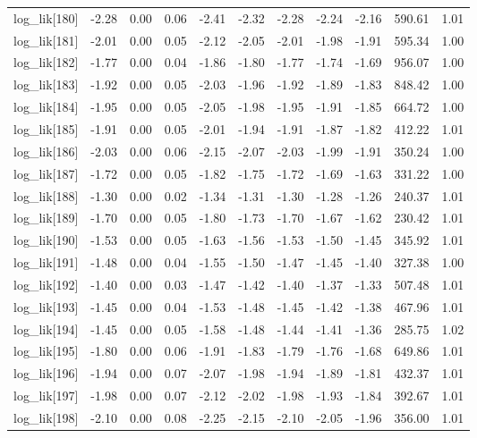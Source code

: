 \begin{table}[ht]
\begin{tabular}{rrrrrrrrrrr}
  log\_lik[180] & -2.28 & 0.00 & 0.06 & -2.41 & -2.32 & -2.28 & -2.24 & -2.16 & 590.61 & 1.01 \\ 
  log\_lik[181] & -2.01 & 0.00 & 0.05 & -2.12 & -2.05 & -2.01 & -1.98 & -1.91 & 595.34 & 1.00 \\ 
  log\_lik[182] & -1.77 & 0.00 & 0.04 & -1.86 & -1.80 & -1.77 & -1.74 & -1.69 & 956.07 & 1.00 \\ 
  log\_lik[183] & -1.92 & 0.00 & 0.05 & -2.03 & -1.96 & -1.92 & -1.89 & -1.83 & 848.42 & 1.00 \\ 
  log\_lik[184] & -1.95 & 0.00 & 0.05 & -2.05 & -1.98 & -1.95 & -1.91 & -1.85 & 664.72 & 1.00 \\ 
  log\_lik[185] & -1.91 & 0.00 & 0.05 & -2.01 & -1.94 & -1.91 & -1.87 & -1.82 & 412.22 & 1.01 \\ 
  log\_lik[186] & -2.03 & 0.00 & 0.06 & -2.15 & -2.07 & -2.03 & -1.99 & -1.91 & 350.24 & 1.00 \\ 
  log\_lik[187] & -1.72 & 0.00 & 0.05 & -1.82 & -1.75 & -1.72 & -1.69 & -1.63 & 331.22 & 1.00 \\ 
  log\_lik[188] & -1.30 & 0.00 & 0.02 & -1.34 & -1.31 & -1.30 & -1.28 & -1.26 & 240.37 & 1.01 \\ 
  log\_lik[189] & -1.70 & 0.00 & 0.05 & -1.80 & -1.73 & -1.70 & -1.67 & -1.62 & 230.42 & 1.01 \\ 
  log\_lik[190] & -1.53 & 0.00 & 0.05 & -1.63 & -1.56 & -1.53 & -1.50 & -1.45 & 345.92 & 1.01 \\ 
  log\_lik[191] & -1.48 & 0.00 & 0.04 & -1.55 & -1.50 & -1.47 & -1.45 & -1.40 & 327.38 & 1.00 \\ 
  log\_lik[192] & -1.40 & 0.00 & 0.03 & -1.47 & -1.42 & -1.40 & -1.37 & -1.33 & 507.48 & 1.01 \\ 
  log\_lik[193] & -1.45 & 0.00 & 0.04 & -1.53 & -1.48 & -1.45 & -1.42 & -1.38 & 467.96 & 1.01 \\ 
  log\_lik[194] & -1.45 & 0.00 & 0.05 & -1.58 & -1.48 & -1.44 & -1.41 & -1.36 & 285.75 & 1.02 \\ 
  log\_lik[195] & -1.80 & 0.00 & 0.06 & -1.91 & -1.83 & -1.79 & -1.76 & -1.68 & 649.86 & 1.01 \\ 
  log\_lik[196] & -1.94 & 0.00 & 0.07 & -2.07 & -1.98 & -1.94 & -1.89 & -1.81 & 432.37 & 1.01 \\ 
  log\_lik[197] & -1.98 & 0.00 & 0.07 & -2.12 & -2.02 & -1.98 & -1.93 & -1.84 & 392.67 & 1.01 \\ 
  log\_lik[198] & -2.10 & 0.00 & 0.08 & -2.25 & -2.15 & -2.10 & -2.05 & -1.96 & 356.00 & 1.01 \\ 

\end{tabular}
\end{table}
